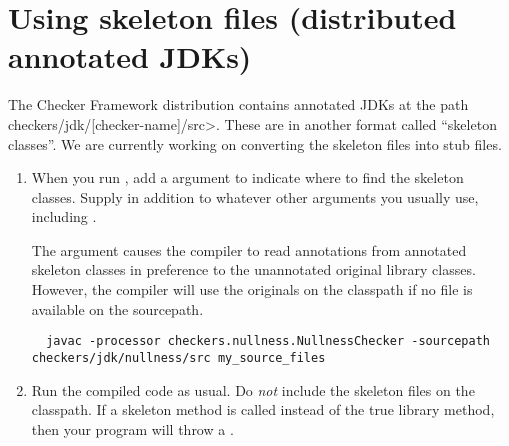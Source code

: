 
\section{Using skeleton files (distributed annotated JDKs)\label{skeleton-using}\label{skeleton}}

The Checker Framework distribution contains 
annotated JDKs at the path \<checkers/jdk/[checker-name]/src>.
These are in another format called
``skeleton classes''.  We are currently working on converting the skeleton
files into stub files.



\begin{enumerate}

\item
  When you run , add a  argument to indicate
  where to find the skeleton classes.
  Supply  in addition to whatever other arguments you
  usually use, including .

  The  argument causes the compiler to read annotations
  from annotated skeleton classes in preference to the unannotated original
  library classes.  However, the compiler will use the originals on the
  classpath if no file is available on the sourcepath.

\begin{smaller}
\begin{Verbatim}
  javac -processor checkers.nullness.NullnessChecker -sourcepath checkers/jdk/nullness/src my_source_files
\end{Verbatim}
\end{smaller}

\item
  Run the compiled code as usual.  Do \emph{not} include the skeleton files
  on the classpath.  If a skeleton method is called instead of the true
  library method, then your program will throw a .

\end{enumerate}



